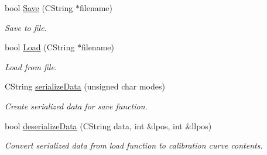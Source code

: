 \begin{Indent}{\bf }\par
{\em \label{_amgrpd41d8cd98f00b204e9800998ecf8427e}
 }\begin{DoxyCompactItemize}
\item 
bool \hyperlink{classCCustomerInfoData_a19e3b91538a41fb6bf0f656ffc63383f}{Save} (CString $\ast$filename)
\begin{DoxyCompactList}\small\item\em Save to file. \item\end{DoxyCompactList}\item 
bool \hyperlink{classCCustomerInfoData_a7979c283e9a7873feb777e922a6ddf5c}{Load} (CString $\ast$filename)
\begin{DoxyCompactList}\small\item\em Load from file. \item\end{DoxyCompactList}\item 
CString \hyperlink{classCCustomerInfoData_ae7ec69bbcf0e57fdf8cda308cdd7f7b6}{serializeData} (unsigned char modes)
\begin{DoxyCompactList}\small\item\em Create serialized data for save function. \item\end{DoxyCompactList}\item 
bool \hyperlink{classCCustomerInfoData_a164b89d82b07c42b1e1a910a31fbb4e9}{deserializeData} (CString data, int \&lpos, int \&llpos)
\begin{DoxyCompactList}\small\item\em Convert serialized data from load function to calibration curve contents. \item\end{DoxyCompactList}\end{DoxyCompactItemize}
\end{Indent}
